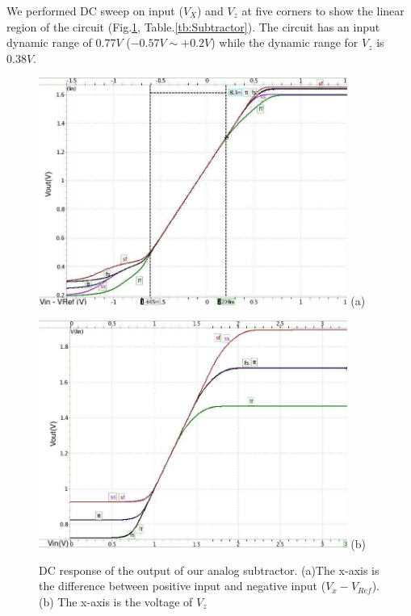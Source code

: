 {We performed DC sweep on input ($V_X$) and $V_z$ at five corners to show the linear region of the circuit (Fig.\ref{fig:sim:subtractor}, Table.\ref{tb:Subtractor}).
The circuit has an input dynamic range of $0.77V$ ($-0.57V \sim +0.2V$) while the dynamic range for $V_z$ is $0.38V$.

\begin{figure}[!htbp]
    \centering
    \begin{minipage}[t]{1\textwidth}
        \includegraphics[width=0.9\textwidth] {images/chapter5/postSim/subtractor_5_xx.jpg}
        \raggedleft
        (a)
    \end{minipage}
    \vfill
    \begin{minipage}[t]{1\textwidth}
        \includegraphics[width=0.9\textwidth] {images/chapter5/postSim/subtractor_5_zz.jpg}
        \raggedleft
        (b)
    \end{minipage}
    \caption{DC response of the output of our analog subtractor. (a)The x-axis is the difference between positive input and negative input ($V_x - V_{Ref}$). (b) The x-axis is the voltage of $V_z$ }
    \label{fig:sim:subtractor}
\end{figure}


}
